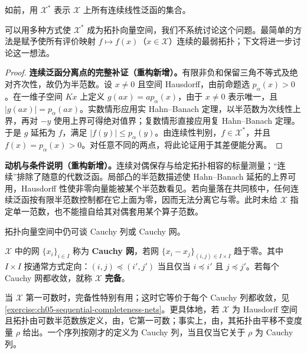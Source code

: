 \documentclass[../../main.tex]{subfiles}
\begin{document}
\begin{definition}[连续对偶]\label{definition:ch05-tvs-continuous-dual}
如前，用 $\mathcal X^*$ 表示 $\mathcal X$ 上所有连续线性泛函的集合。
\end{definition}
可以用多种方式使 $\mathcal X^*$ 成为拓扑向量空间，我们不系统讨论这个问题。最简单的方法是赋予使所有评价映射 $f\mapsto f(x)$（$x\in\mathcal X$）连续的最弱拓扑；下文将进一步讨论这一想法。
\begin{proof}
\textbf{连续泛函分离点的完整补证（重构新增）。}有限非负和保留三角不等式及绝对齐次性，故仍为半范数。设 $x\ne0$ 且空间 Hausdorff，由前命题选 $p_\alpha(x)>0$。在一维子空间 $Kx$ 上定义 $g(ax)=a p_\alpha(x)$，由于 $x\ne0$ 表示唯一，且 $|g(ax)|=p_\alpha(ax)$。实数情形应用实 Hahn--Banach 定理，以半范数为次线性上界，再对 $-y$ 使用上界可得绝对值界；复数情形直接应用复 Hahn--Banach 定理。于是 $g$ 延拓为 $f$，满足 $|f(y)|\le p_\alpha(y)$。由连续性判别，$f\in\mathcal X^*$，并且 $f(x)=p_\alpha(x)>0$。对任意不同的两点，将此论证用于其差便能分离。
\end{proof}
\begin{remark}
\textbf{动机与条件说明（重构新增）。}连续对偶保存与给定拓扑相容的标量测量；“连续”排除了随意的代数泛函。局部凸的半范数描述使 Hahn--Banach 延拓的上界可用，Hausdorff 性使非零向量能被某个半范数看见。若向量落在共同核中，任何连续泛函按有限半范数控制都在它上面为零，因而无法分离它与零。此时未给 $\mathcal X$ 指定单一范数，也不能擅自给其对偶套用某个算子范数。
\end{remark}
拓扑向量空间中仍可谈 Cauchy 列或 Cauchy 网。
\begin{definition}\label{definition:ch05-tvs-cauchy}
$\mathcal X$ 中的网 $\{x_i\}_{i\in I}$ 称为 \textbf{Cauchy 网}，若网 $\{x_i-x_j\}_{(i,j)\in I\times I}$ 趋于零。其中 $I\times I$ 按通常方式定向：$(i,j)\preceq(i',j')$ 当且仅当 $i\preceq i'$ 且 $j\preceq j'$。若每个 Cauchy 网都收敛，就称 $\mathcal X$ \textbf{完备}。
\end{definition}
当 $\mathcal X$ 第一可数时，完备性特别有用；这时它等价于每个 Cauchy 列都收敛，见\cref{exercise:ch05-sequential-completeness-nets}。更具体地，若 $\mathcal X$ 为 Hausdorff 空间且拓扑由可数半范数族定义，由，它第一可数；事实上，由，其拓扑由平移不变度量 $\rho$ 给出。一个序列按刚才的定义为 Cauchy 列，当且仅当它关于 $\rho$ 为 Cauchy 列。
\end{document}
